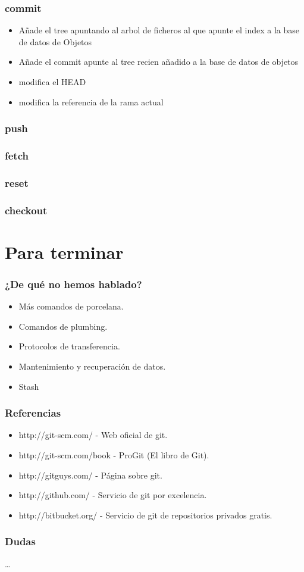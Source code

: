\documentclass[10pt]{beamer}
\begin{document}
  \begin{frame}
    \frametitle{commit}
    \begin{itemize}
      \item Añade el tree apuntando al arbol de ficheros al que apunte el index a la base de datos de Objetos
      \item Añade el commit apunte al tree recien añadido a la base de datos de objetos
      \item modifica el HEAD
      \item modifica la referencia de la rama actual
    \end{itemize}
  \end{frame}

  \begin{frame}
    \frametitle{push}
  \end{frame}

  \begin{frame}
    \frametitle{fetch}
  \end{frame}

  \begin{frame}
    \frametitle{reset}
  \end{frame}

  \begin{frame}
    \frametitle{checkout}
  \end{frame}

  \section*{Para terminar}

  \begin{frame}
    \frametitle{¿De qué no hemos hablado?}
    \begin{itemize}
        \item Más comandos de porcelana.
        \item Comandos de plumbing.
        \item Protocolos de transferencia.
        \item Mantenimiento y recuperación de datos.
        \item Stash
    \end{itemize}
  \end{frame}

  \begin{frame}
    \frametitle{Referencias}
    \begin{itemize}
      \item \small{http://git-scm.com/ - Web oficial de git.}
      \item \small{http://git-scm.com/book - ProGit (El libro de Git).}
      \item \small{http://gitguys.com/ - Página sobre git.}
      \item \small{http://github.com/ - Servicio de git por excelencia.}
      \item \small{http://bitbucket.org/ - Servicio de git de repositorios privados gratis.}
    \end{itemize}
  \end{frame}

  \begin{frame}
    \frametitle{Dudas}
    \dots
  \end{frame}
\end{document}
